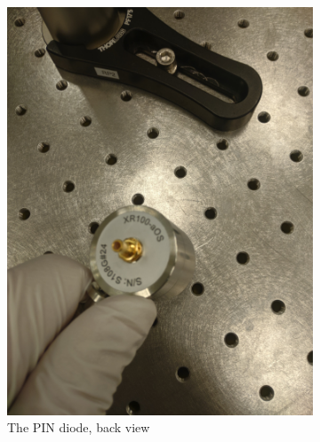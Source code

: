 \documentclass[a4paper, 10pt]{article}
\begin{document}
\begin{figure}[h]
\begin{subfigure}{0.4\textwidth}
        \includegraphics[width=\textwidth]{./images/pin-back.jpg}
        \caption{The PIN diode, back view}
        \label{fig:pin-diode}
    \end{subfigure}
    \begin{subfigure}{0.4\textwidth}
        \centering

\end{subfigure}
\end{figure}
\end{document}
